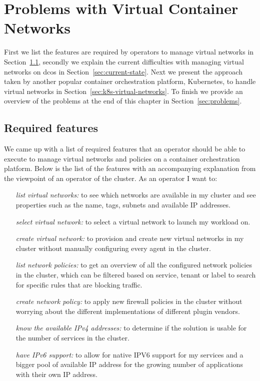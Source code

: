 \chapter{Problems with Virtual Container Networks}
\label{chap:research}
 First we list the features are required by operators to manage virtual networks in Section~\ref{sec:required-features}, secondly we explain the current difficulties with managing virtual networks on \gls{dcos} in Section~\ref{sec:current-state}. Next we present the approach taken by another popular container orchestration platform, Kubernetes, to handle virtual networks in Section~\ref{sec:k8s-virtual-networks}. To finish we provide an overview of the problems at the end of this chapter in Section~\ref{sec:problems}.

\section{Required features}
\label{sec:required-features}
We came up with a list of required features that an operator should be able to execute to manage virtual networks and policies on a container orchestration platform. Below is the list of the features with an accompanying explanation from the viewpoint of an operator of the cluster. As an operator I want to:
\begin{itemize}
    \item[\textit{list virtual networks:}] to see which networks are available in my cluster and see properties such as the name, tags, subnets and available IP addresses.
    \item[\textit{select virtual network:}] to select a virtual network to launch my workload on.
    \item[\textit{create virtual network:}] to provision and create new virtual networks in my cluster without manually configuring every agent in the cluster.
    \item[\textit{list network policies:}] to get an overview of all the configured network policies in the cluster, which can be filtered based on service, tenant or label to search for specific rules that are blocking traffic.
    \item[\textit{create network policy:}] to apply new firewall policies in the cluster without worrying about the different implementations of different plugin vendors.
    \item[\textit{know the available IPv4 addresses:}] to determine if the solution is usable for the number of services in the cluster.
    \item[\textit{have IPv6 support:}] to allow for native IPV6 support for my services and a bigger pool of available IP address for the growing number of applications with their own IP address.
\end{itemize}

